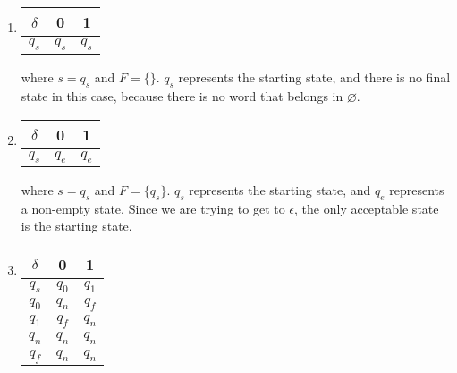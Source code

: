 \documentclass[11pt]{article}
\theoremstyle{definition}
\theoremstyle{case}
\theoremstyle{theorem}
\begin{document}
\begin{enumerate}[label=(\alph*)]

\item
\begin{tabular}{|c||c|c|}
$\delta$ & 0 & 1 \\

\hline

$q_s$ & $q_s$ & $q_s$ 

\end{tabular}

where $s = q_s$ and $F = \{\}$. $q_s$ represents the starting state,
and there is no final state in this case, because there is no
word that belongs in $\varnothing$.

\vspace{15px}

\item
\begin{tabular}{|c||c|c|}
$\delta$ & 0 & 1 \\

\hline

$q_s$ & $q_e$ & $q_e$

\end{tabular}

where $s = q_s$ and $F = \{q_s\}$. $q_s$ represents the starting state,
and $q_e$ represents a non-empty state. Since we are trying to get to
$\epsilon$, the only acceptable state is the starting state.

\vspace{15px}

\item
\begin{tabular}{|c||c|c|}

$\delta$ & 0 & 1 \\

\hline

$q_s$ & $q_0$ & $q_1$ \\

\hline

$q_0$ & $q_n$ & $q_f$ \\

\hline

$q_1$ & $q_f$ & $q_n$ \\

\hline

$q_n$ & $q_n$ & $q_n$ \\

\hline

$q_f$ & $q_n$ & $q_n$

\end{tabular}


\end{enumerate}
\end{document}
